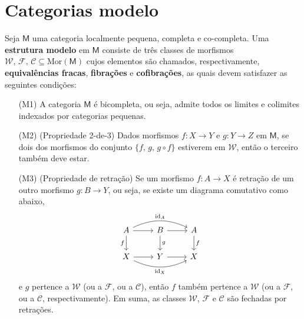 \section{Categorias modelo}

\begin{defin}
  Seja $\mathsf{M}$ uma categoria localmente pequena, completa e co-completa.
  Uma \textbf{estrutura modelo} em $\mathsf{M}$ consiste de três classes de morfismos $\mathcal{W},\, \mathcal{F},\, \mathcal{C} \subseteq \mathrm{Mor}(\mathsf{M})$ cujos elementos são chamados, respectivamente, \textbf{equivalências fracas}, \textbf{fibrações} e \textbf{cofibrações}, as quais devem satisfazer as seguintes condições:
  \begin{enumerate}
  \item[(M1)] A categoria $\mathsf{M}$ é bicompleta, ou seja, admite todos os limites e colimites indexados por categorias pequenas.
    
  \item[(M2)] (Propriedade 2-de-3) Dados morfismos $f: X \to Y$ e $g: Y \to Z$ em $\mathsf{M}$, se dois dos morfismos do conjunto $\{f,\,g,\, g \circ f\}$ estiverem em $\mathcal{W}$, então o terceiro também deve estar.
    
  \item[(M3)] (Propriedade de retração) Se um morfismo $f: A \to X$ é retração de um outro morfismo $g: B \to Y$, ou seja, se existe um diagrama comutativo como abaixo,
    \begin{displaymath}
      \begin{tikzcd}
        A
        \arrow[r]
        \arrow[d, "f" swap]
        \arrow[rr, bend left=25, "\id_{A}"]
        & B
        \arrow[r]
        \arrow[d, "g"]
        & A
        \arrow[d, "f"]
        \\ X
        \arrow[r]
        \arrow[rr, bend right=25, "\id_{X}" swap]
        & Y
        \arrow[r]
        & X
      \end{tikzcd}
    \end{displaymath}
    e $g$ pertence a $\mathcal{W}$ (ou a $\mathcal{F}$, ou a $\mathcal{C}$), então $f$ também pertence a $\mathcal{W}$ (ou a $\mathcal{F}$, ou a $\mathcal{C}$, respectivamente).
    Em suma, as classes $\mathcal{W}$, $\mathcal{F}$ e $\mathcal{C}$ são fechadas por retrações.
    

\end{enumerate}
\end{defin}
